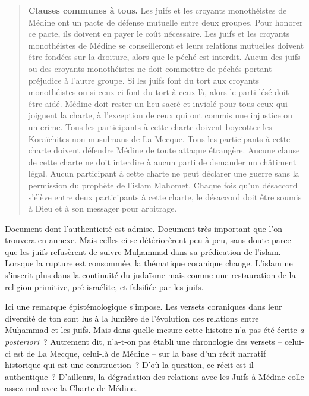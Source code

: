 \begin{quote}
\begin{footnotesize}
{\textbf{Clauses communes à
tous.} Les juifs et les croyants monothéistes de Médine ont un
pacte de défense mutuelle entre deux groupes. Pour honorer ce pacte, ils
doivent en payer le coût
nécessaire. Les juifs et les croyants monothéistes de Médine se
conseilleront et leurs relations mutuelles doivent être fondées sur la
droiture, alors que le péché est
interdit. Aucun des juifs ou des croyants monothéistes ne doit
commettre de péchés portant préjudice à l'autre
groupe. Si les juifs font du tort aux croyants monothéistes ou si
ceux-ci font du tort à ceux-là, alors le parti lésé doit être
aidé. Médine doit rester un lieu sacré et inviolé pour tous
ceux qui joignent la charte, à l'exception de ceux qui ont commis une
injustice ou un
crime. Tous les participants à cette charte doivent boycotter
les Koraïchites non-musulmans de La
Mecque. Tous les participants à cette charte doivent défendre
Médine de toute attaque
étrangère. Aucune clause de cette charte ne doit interdire à aucun
parti de demander un châtiment
légal. Aucun participant à cette charte ne peut déclarer une
guerre sans la permission du prophète de l'islam
Mahomet. Chaque fois qu'un désaccord s'élève entre deux
participants à cette charte, le désaccord doit être soumis à Dieu et à
son messager pour
arbitrage.} 

\end{footnotesize}

    
\end{quote}
Document dont l'authenticité est admise. Document très important que
l'on trouvera en annexe. Mais celles-ci se détériorèrent peu à peu,
sans-doute parce que les juifs refusèrent de suivre Muḥammad dans sa
prédication de l'islam. Lorsque la rupture est consommée, la thématique
coranique change. L'islam ne s'inscrit plus dans la continuité du
judaïsme mais comme une restauration de la religion primitive,
pré-israélite, et falsifiée par les juifs.

Ici une remarque épistémologique s'impose. Les versets coraniques dans
leur diversité de ton sont lus à la lumière de l'évolution des relations
entre Muḥammad et les juifs. Mais dans quelle mesure cette histoire n'a
pas été écrite \emph{a posteriori}~? Autrement dit, n'a-t-on pas établi
une chronologie des versets -- celui-ci est de La Mecque, celui-là de
Médine -- sur la base d'un récit narratif historique qui est une
construction~? D'où la question, ce récit est-il authentique~?
D'ailleurs, la dégradation des relations avec les Juifs à Médine colle
assez mal avec la Charte de Médine.

